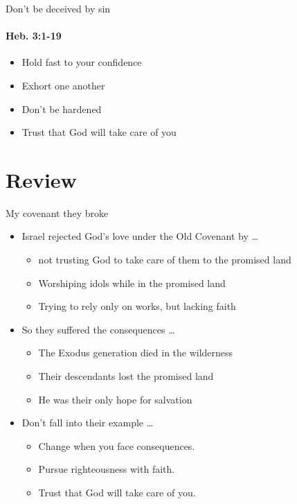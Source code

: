 \begin{frame}{Don't be deceived by sin}
\framesubtitle{Heb. 3:1-19}
\begin{itemize}
	\item Hold fast to your confidence
	\item Exhort one another
    \item Don't be hardened
    \item Trust that God will take care of you
\end{itemize}

\end{frame}
\section{Review}

\begin{frame}{My covenant they broke}
	\begin{itemize}
		\item Israel rejected God's love under the Old Covenant by \ldots
		\begin{itemize}
			\item not trusting God to take care of them to the promised land
			\item Worshiping idols while in the promised land
			\item Trying to rely only on works, but lacking faith
		\end{itemize}
		\item So they suffered the consequences \ldots
		\begin{itemize}
			\item The Exodus generation died in the wilderness
			\item Their descendants lost the promised land
			\item He was their only hope for salvation
		\end{itemize}
		\item Don't fall into their example \ldots
		\begin{itemize}
			\item Change when you face consequences.
			\item Pursue righteousness with faith.
			\item Trust that God will take care of you.
		\end{itemize}
	\end{itemize}
		
\end{frame}